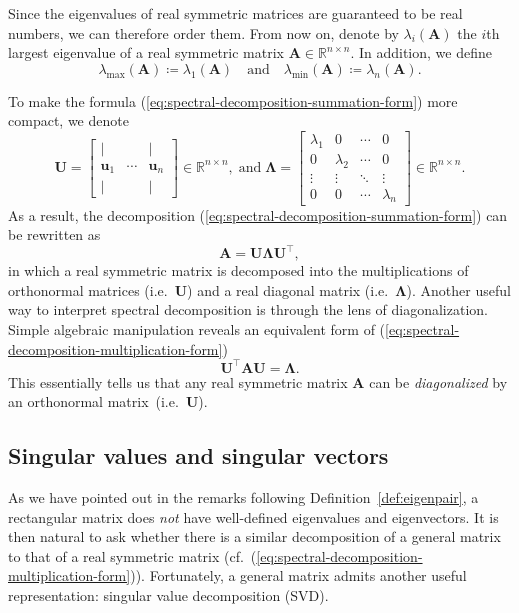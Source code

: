Since the eigenvalues of real symmetric matrices are guaranteed to
be real numbers, we can therefore order them. From now on, denote
by $\lambda_{i}(\bm{A})$ the $i$th largest eigenvalue of a real
symmetric matrix $\bm{A}\in\mathbb{R}^{n\times n}$. In addition,
we define 
$$\lambda_{\max}(\bm{A})\coloneqq\lambda_{1}(\bm{A}) \quad \mbox{and}
\quad \lambda_{\min}(\bm{A})\coloneqq\lambda_{n}(\bm{A}). $$

To make the formula (\ref{eq:spectral-decomposition-summation-form})
more compact, we denote 
\[
\bm{U}=\left[\begin{array}{ccc}
\rvert &  & \rvert\\
\bm{u}_{1} & \cdots & \bm{u}_{n}\\
\rvert &  & \rvert
\end{array}\right]\in\mathbb{R}^{n\times n},\;\text{and}\;\bm{\Lambda}=\left[\begin{array}{cccc}
\lambda_{1} & 0 & \cdots & 0\\
0 & \lambda_{2} & \cdots & 0\\
\vdots & \vdots & \ddots & \vdots\\
0 & 0 & \cdots & \lambda_{n}
\end{array}\right]\in\mathbb{R}^{n\times n}.
\]
As a result, the decomposition (\ref{eq:spectral-decomposition-summation-form})
can be rewritten as 
\begin{equation}
\bm{A}=\bm{U}\bm{\Lambda}\bm{U}^{\top},\label{eq:spectral-decomposition-multiplication-form}
\end{equation}
in which a real symmetric matrix is decomposed into the multiplications
of orthonormal matrices (i.e.~$\bm{U}$) and a real diagonal matrix
(i.e.~$\bm{\Lambda}$). Another useful way to interpret spectral
decomposition is through the lens of diagonalization. Simple algebraic
manipulation reveals an equivalent form of (\ref{eq:spectral-decomposition-multiplication-form})
\begin{equation}
\bm{U}^{\top}\bm{A}\bm{U}=\bm{\Lambda}.\label{eq:spectral-decomposition-diagonalization-form}
\end{equation}
This essentially tells us that any real symmetric matrix $\bm{A}$
can be \emph{diagonalized }by an orthonormal matrix~(i.e.~$\bm{U}$).

\subsection{Singular values and singular vectors}

As we have pointed out in the remarks following Definition~\ref{def:eigenpair},
a rectangular matrix does \emph{not} have well-defined eigenvalues
and eigenvectors. It is then natural to ask whether there is a similar
decomposition of a general matrix to that of a real symmetric matrix
(cf.~(\ref{eq:spectral-decomposition-multiplication-form})). Fortunately,
a general matrix admits another useful representation: singular value
decomposition (SVD).

